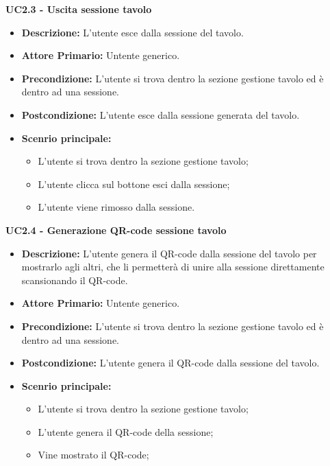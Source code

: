 \textbf{UC2.3 - Uscita sessione tavolo}
\begin{itemize}
    \item \textbf{Descrizione:} L'utente esce dalla sessione del tavolo.
    \item \textbf{Attore Primario:} Untente generico.
    \item \textbf{Precondizione:} L'utente si trova dentro la sezione gestione tavolo ed è dentro ad una sessione.
    \item \textbf{Postcondizione:} L'utente esce dalla sessione generata del tavolo.
    \item \textbf{Scenrio principale:}
    \begin{itemize}
        \item L'utente si trova dentro la sezione gestione tavolo;
        \item L'utente clicca sul bottone esci dalla sessione;
        \item L'utente viene rimosso dalla sessione.
    \end{itemize}
\end{itemize}
\textbf{UC2.4 - Generazione QR-code sessione tavolo}
\begin{itemize}
    \item \textbf{Descrizione:} L'utente genera il QR-code dalla sessione del tavolo per mostrarlo agli altri, che li permetterà di unire alla sessione direttamente scansionando il QR-code.
    \item \textbf{Attore Primario:} Untente generico.
    \item \textbf{Precondizione:} L'utente si trova dentro la sezione gestione tavolo ed è dentro ad una sessione.
    \item \textbf{Postcondizione:} L'utente genera il QR-code dalla sessione del tavolo.
    \item \textbf{Scenrio principale:}
    \begin{itemize}
        \item L'utente si trova dentro la sezione gestione tavolo;
        \item L'utente genera il QR-code della sessione;
        \item Vine mostrato il QR-code;
    \end{itemize}
\end{itemize}



